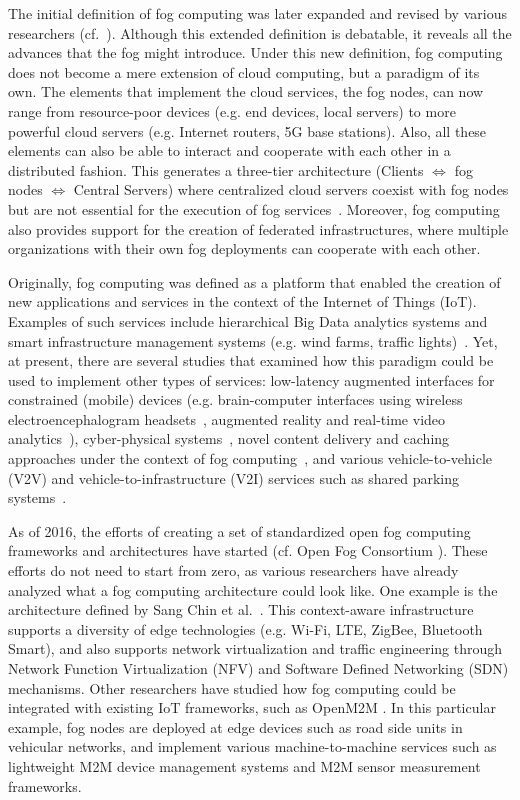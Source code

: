 \documentclass[twocolumn,preprint,3p]{elsarticle}
\begin{document}
The initial definition of fog computing was later expanded and revised by various researchers (cf.~\cite{Vaquero14,Yi15}). Although this extended definition is debatable, it reveals all the advances that the fog might introduce. Under this new definition, fog computing does not become a mere extension of cloud computing, but a paradigm of its own. The elements that implement the cloud services, the fog nodes, can now range from resource-poor devices (e.g. end devices, local servers) to more powerful cloud servers (e.g. Internet routers, 5G base stations). Also, all these elements can also be able to interact and cooperate with each other in a distributed fashion. This generates a three-tier architecture (Clients $\Leftrightarrow$ fog nodes $\Leftrightarrow$ Central Servers) where centralized cloud servers coexist with fog nodes but are not essential for the execution of fog services~\cite{Luan15}. Moreover, fog computing also provides support for the creation of federated infrastructures, where multiple organizations with their own fog deployments can cooperate with each other.

Originally, fog computing was defined as a platform that enabled the creation of new applications and services in the context of the Internet of Things (IoT). Examples of such services include hierarchical Big Data analytics systems and smart infrastructure management systems (e.g. wind farms, traffic lights)~\cite{Bonomi12,Vaquero14}. Yet, at present, there are several studies that examined how this paradigm could be used to implement other types of services: low-latency augmented interfaces for constrained (mobile) devices (e.g. brain-computer interfaces using wireless electroencephalogram headsets~\cite{Zao14}, augmented reality and real-time video analytics~\cite{Ha14}), cyber-physical systems~\cite{StojmenovicCG14}, novel content delivery and caching approaches under the context of fog computing~\cite{Jingtao15}, and various vehicle-to-vehicle (V2V) and vehicle-to-infrastructure (V2I) services such as shared parking systems~\cite{Kim15}.

As of 2016, the efforts of creating a set of standardized open fog computing frameworks and architectures have started (cf. Open Fog Consortium \cite{OpenFog15}). These efforts do not need to start from zero, as various researchers have already analyzed what a fog computing architecture could look like. One example is the architecture defined by Sang Chin et al.~\cite{Chin15}. This context-aware infrastructure supports a diversity of edge technologies (e.g. Wi-Fi, LTE, ZigBee, Bluetooth Smart), and also supports network virtualization and traffic engineering through Network Function Virtualization (NFV) and Software Defined Networking (SDN) mechanisms. Other researchers have studied how fog computing could be integrated with existing IoT frameworks, such as OpenM2M \cite{Datta15}. In this particular example, fog nodes are deployed at edge devices such as road side units in vehicular networks, and implement various machine-to-machine services such as lightweight M2M device management systems and M2M sensor measurement frameworks.
\end{document}
